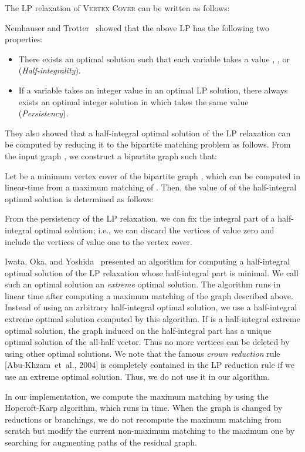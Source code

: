\documentclass[11pt]{article}
\begin{document}
The LP relaxation of \textsc{Vertex Cover} can be written as follows:

Nemhauser and Trotter~\cite{NemhauserT75} showed that the above LP has the following two properties:
\begin{itemize}
  \item There exists an optimal solution such that each variable takes a value , , or
   (\emph{Half-integrality}).
  \item If a variable  takes an integer value in an optimal LP solution, there always exists an optimal integer
  solution in which  takes the same value (\emph{Persistency}).
\end{itemize}
They also showed that a half-integral optimal solution of the LP relaxation can be computed by reducing it to the bipartite
matching problem as follows.
From the input graph , we construct a bipartite graph  such that:

Let  be a minimum vertex cover of the bipartite graph ,
which can be computed in linear-time from
a maximum matching of .
Then, the value of  of the half-integral optimal solution is determined as follows:


From the persistency of the LP relaxation, we can fix the integral part of a half-integral optimal solution;
i.e., we can discard the vertices of value zero and include the vertices of value one to the vertex cover.

Iwata, Oka, and Yoshida~\cite{bip2/iwata14} presented an algorithm for computing a half-integral
optimal solution of the LP relaxation whose half-integral part is minimal.
We call such an optimal solution an \emph{extreme} optimal solution.
The algorithm runs in linear time after computing a maximum matching of the graph described above.
Instead of using an arbitrary half-integral optimal solution, we use a half-integral extreme optimal solution
computed by this algorithm.
If  is a half-integral extreme optimal solution, the graph induced on the half-integral part has a unique optimal
solution of the all-half vector.
Thus no more vertices can be deleted by using other optimal solutions.
We note that the famous \emph{crown reduction} rule [Abu-Khzam~et~al., 2004] is
completely contained in the LP reduction rule if we use an extreme optimal solution.
Thus, we do not use it in our algorithm.

In our implementation, we compute the maximum matching by using the Hopcroft-Karp algorithm, which runs in
 time.
When the graph is changed by reductions or branchings, we do not recompute the maximum matching from scratch but
modify the current non-maximum matching to the maximum one by searching for augmenting paths of the residual graph.
\end{document}

